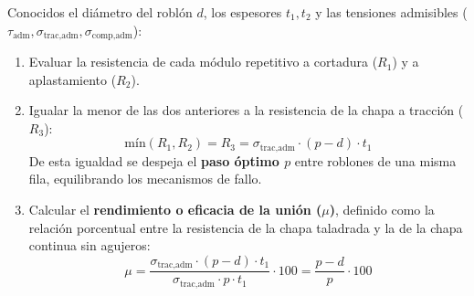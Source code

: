 \begin{ImportanteBox}[title={Procedimiento General de Diseño Óptimo y Rendimiento de la Unión ($\mu$)}]
    Conocidos el diámetro del roblón $d$, los espesores $t_1, t_2$ y las tensiones admisibles ($\tau_{\text{adm}}, \sigma_{\text{trac,adm}}, \sigma_{\text{comp,adm}}$):
    \begin{enumerate}
        \item Evaluar la resistencia de cada módulo repetitivo a cortadura ($R_1$) y a aplastamiento ($R_2$).
        \item Igualar la menor de las dos anteriores a la resistencia de la chapa a tracción ($R_3$):
              \begin{equation*}
                  \text{mín}(R_1, R_2) = R_3 = \sigma_{\text{trac,adm}} \cdot (p - d) \cdot t_1
              \end{equation*}
              De esta igualdad se despeja el \textbf{paso óptimo $p$} entre roblones de una misma fila, equilibrando los mecanismos de fallo.
        \item Calcular el \textbf{rendimiento o eficacia de la unión ($\mu$)}, definido como la relación porcentual entre la resistencia de la chapa taladrada y la de la chapa continua sin agujeros:
              \begin{equation}
                  \mu = \frac{\sigma_{\text{trac,adm}} \cdot (p - d)\cdot t_1}{\sigma_{\text{trac,adm}} \cdot p \cdot t_1}\cdot 100 = \frac{p - d}{p}\cdot 100
                  \label{eq:t8_rendimiento_union}
              \end{equation}
    \end{enumerate}
\end{ImportanteBox}

